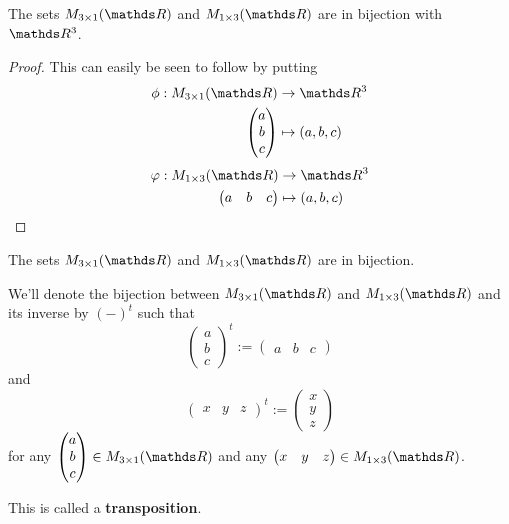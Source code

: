 \begin{prop}
	The sets $M_{3\times 1}(\R)$ and $M_{1\times 3}(\R)$ are in bijection with $\R^3$.
\end{prop}
\begin{proof}
	This can easily be seen to follow by putting
	\begin{align*}
		\phi:M_{3\times 1}(\R)&\to\R^3\\\begin{pmatrix}
		a\\b\\c
		\end{pmatrix}&\mapsto (a,b,c)
	\end{align*}
	\begin{align*}
	\varphi:M_{1\times 3}(\R)&\to\R^3\\\begin{pmatrix}
	a&b&c
	\end{pmatrix}&\mapsto (a,b,c)
	\end{align*}
\end{proof}
\begin{cor}
	The sets $M_{3\times 1}(\R)$ and $M_{1\times 3}(\R)$ are in bijection.
\end{cor}

\begin{df}
	We'll denote the bijection between $M_{3\times 1}(\R)$ and $M_{1\times 3}(\R)$ and its inverse by $(-)^t$ such that
	\[\begin{pmatrix}
	a\\b\\c
	\end{pmatrix}^t:=\begin{pmatrix}
	a&b&c
	\end{pmatrix}\]and
	\[\begin{pmatrix}
	x&y&z
	\end{pmatrix}^t:=\begin{pmatrix}
	x\\y\\z
	\end{pmatrix}\]for any $\begin{pmatrix}
	a\\b\\c
	\end{pmatrix}\in M_{3\times 1}(\R)$ and any $\begin{pmatrix}
	x&y&z\end{pmatrix}\in M_{1\times 3}(\R)$.
	
	This is called a \textbf{transposition}.
\end{df}

